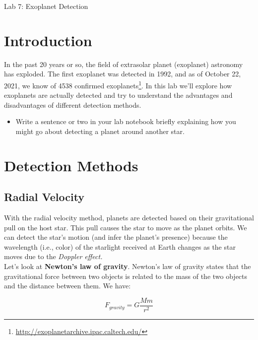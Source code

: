 \documentclass[12pt]{article}%
\begin{document}
\begin{center}
    \LARGE Lab 7: Exoplanet Detection
\end{center}

\section{Introduction}

In the past 20 years or so, the field of extrasolar planet (exoplanet) astronomy has exploded. 
The first exoplanet was detected in 1992, and as of October 22, 2021, we know of 4538 confirmed exoplanets\footnote{\url{http://exoplanetarchive.ipac.caltech.edu/}}. In this lab we'll explore how exoplanets are actually detected and try to understand the advantages and disadvantages of different detection methods. 
\begin{itemize}
    \item Write a sentence or two in your lab notebook briefly explaining how you might go about detecting a planet around another star. 
\end{itemize}

\section{Detection Methods}

\subsection{Radial Velocity} 

\vspace{0.1in}

\noindent With the radial velocity method, planets are detected based on their gravitational pull on the host star. This pull causes the star to move as the planet orbits. We can detect the star's motion (and infer the planet's presence) because the wavelength (i.e., color) of the starlight received at Earth changes as the star moves due to the \textit{Doppler effect.}  \\

\noindent Let's look at \textbf{Newton's law of gravity}.  Newton's law of gravity states that the gravitational force between two objects is related to the mass of the two objects and the distance between them.  We have:

\begin{equation}
F_{gravity}  = G \frac{M m}{r^2}
\end{equation}
\end{document}
